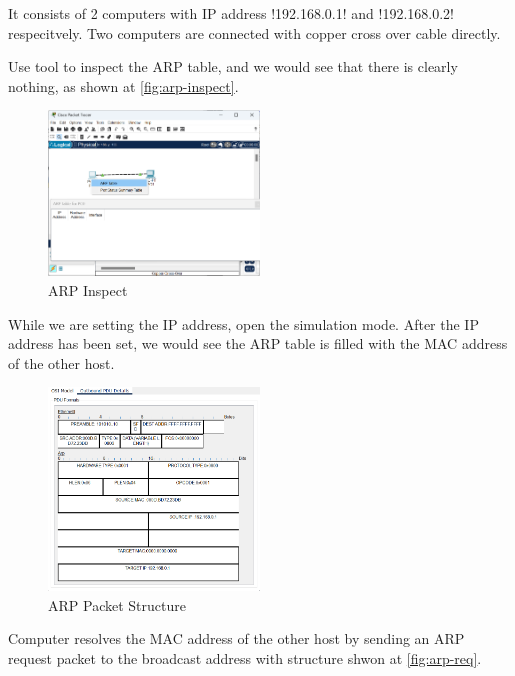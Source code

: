 It consists of 2 computers with IP address \mono!192.168.0.1! and
\mono!192.168.0.2! respecitvely. Two computers are connected with
copper cross over cable directly.

Use   tool to inspect the ARP table, and we would
see that there is clearly nothing, as shown at \autoref{fig:arp-inspect}.

\begin{figure}[!htbp]
    \centering
    \includegraphics[width=0.5\textwidth]{images/arp-inspect.png}
    \caption{ARP Inspect}\label{fig:arp-inspect}
\end{figure}

While we are setting the IP address, open the simulation mode. After the IP
address has been set, we would see the ARP table is filled with the MAC address
of the other host.

\begin{figure}[!htbp]
    \centering
    \includegraphics[width=0.5\textwidth]{images/arp-req.png}
    \caption{ARP Packet Structure}\label{fig:arp-req}
\end{figure}

Computer resolves the MAC address of the other host by sending an ARP request
packet to the broadcast address with structure shwon at \autoref{fig:arp-req}.

